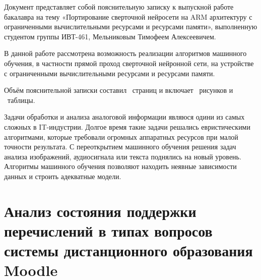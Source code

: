 \documentclass[a4paper,english,russian]{G2-105}
\begin{document}
\VSTUSetFacilityExpert{}{}{}{}
\VSTUInitializePZ
{}
\par Документ представляет собой пояснительную записку к выпускной работе бакалавра на тему «Портирование сверточной нейросети на ARM архитектуру с ограниченными вычислительными ресурсами и ресурсами памяти», выполненную студентом группы ИВТ-461, Мельниковым Тимофеем Алексеевичем.
\par В данной работе рассмотрена возможность реализации алгоритмов машинного обучения, в частности прямой проход сверточной нейронной сети, на устройстве с ограниченными вычислительными ресурсами и ресурсами памяти.
\par Объём пояснительной записки составил \totalpages~страниц и включает \totalfigures~рисунков и \totaltables~таблицы. 

\tableofcontents
\newpage

\par Задачи обработки и анализа аналоговой информации являюся одини из самых сложных в IT-индустрии. Долгое
время такие задачи решались евристическими алгоритмами, которые требовали огромных аппаратных ресурсов при малой точности результата. С переоткрытием машинного обучения решения задач анализа изображений, аудиосигнала или текста поднялись на новый уровень. Алгоритмы машинного обучения позволяют находить неявные зависимости данных и строить адекватные модели.
\newpage

\chapter{Анализ состояния поддержки перечислений в типах вопросов системы дистанционного образования Moodle}
\ttl
\end{document}
